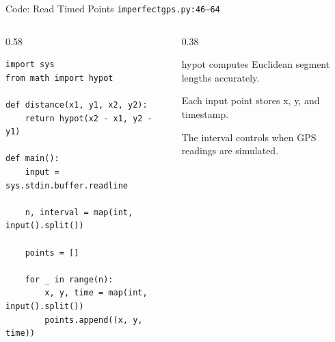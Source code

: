 \documentclass[aspectratio=169,11pt]{beamer}
\begin{document}
\begin{frame}[fragile]{Code: Read Timed Points}
\scriptsize
{} \texttt{imperfectgps.py:46--64}

\vspace{0.08cm}
\begin{columns}[T,totalwidth=\textwidth]
\begin{column}{0.58\textwidth}
\begin{lstlisting}[style=cpcode]
import sys
from math import hypot

def distance(x1, y1, x2, y2):
    return hypot(x2 - x1, y2 - y1)

def main():
    input = sys.stdin.buffer.readline

    n, interval = map(int, input().split())

    points = []

    for _ in range(n):
        x, y, time = map(int, input().split())
        points.append((x, y, time))
\end{lstlisting}
\end{column}
\begin{column}{0.38\textwidth}
\begin{tightitemize}
  \item hypot computes Euclidean segment lengths accurately.
  \item Each input point stores x, y, and timestamp.
  \item The interval controls when GPS readings are simulated.
\end{tightitemize}
\end{column}
\end{columns}
\end{frame}
\end{document}
